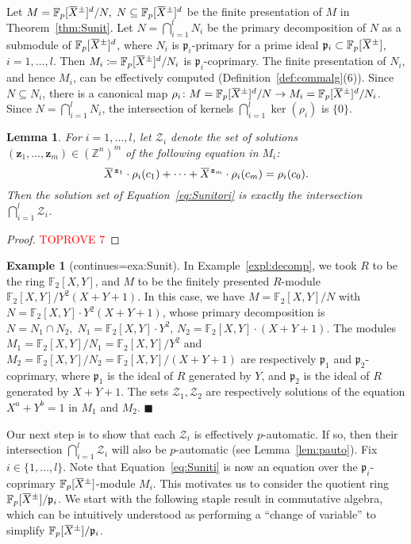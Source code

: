 \documentclass[a4paper,UKenglish,cleveref, autoref, thm-restate]{lipics-v2021}
\newcommand{\Z}{\mathbb{Z}}
\newcommand{\F}{\mathbb{F}}
\newcommand{\mZ}{\mathcal{Z}}
\newcommand{\bz}{\boldsymbol{z}}
\newcommand{\oX}{\mkern 1.5mu\overline{\mkern-1.5mu X \mkern-1.5mu}\mkern 1.5mu}
\newcommand{\frp}{\mathfrak{p}}
\newtheorem{lem}[thrm]{Lemma}
\theoremstyle{definition}
\theoremstyle{definition}
\newtheorem{exmpl}[thrm]{Example}
\theoremstyle{definition}
\begin{document}
Let $M = \F_p[\oX^{\pm}]^d/N, \; N \subseteq \F_p[\oX^{\pm}]^d$ be the finite presentation of $M$ in Theorem~\ref{thm:Sunit}.
Let $N = \bigcap_{i = 1}^l N_i$ be the primary decomposition of $N$ as a submodule of $\F_p[\oX^{\pm}]^d$, where $N_i$ is $\frp_i$-primary for a prime ideal $\frp_i \subset \F_p[\oX^{\pm}]$, $i = 1, \ldots, l$.
Then $M_i \coloneqq \F_p[\oX^{\pm}]^d/N_i$ is $\frp_i$-coprimary.
The finite presentation of $N_i$, and hence $M_i$, can be effectively computed (Definition~\ref{def:commalg}(6)).
Since $N \subseteq N_i$, there is a canonical map $\rho_i \colon M = \F_p[\oX^{\pm}]^d/N \rightarrow M_i = \F_p[\oX^{\pm}]^d/N_i$.
Since $N = \bigcap_{i = 1}^l N_i$, the intersection of kernels $\bigcap_{i=1}^l \ker(\rho_i)$ is $\{0\}$.



\begin{lem}\label{lem:inter}
    For $i = 1, \ldots, l$, let $\mZ_i$ denote the set of solutions $(\bz_1, \ldots, \bz_m) \in \left(\Z^n\right)^m$ of the following equation in $M_i$:
    \begin{equation}\label{eq:Suniti}
        \oX^{\bz_1} \cdot \rho_i(c_1) + \cdots + \oX^{\bz_m} \cdot \rho_i(c_m) = \rho_i(c_0).
    \end{equation}
    Then the solution set of Equation~\eqref{eq:Sunitori} is exactly the intersection $\bigcap_{i = 1}^l \mZ_i$.
\end{lem}
\begin{proof}\textcolor{red}{TOPROVE 7}\end{proof}

\renewcommand\thmcontinues[1]{continued}
\begin{exmpl}[continues=exa:Sunit]
In Example~\ref{expl:decomp}, we took $R$ to be the ring $\F_2[X, Y]$, and $M$ to be the finitely presented $R$-module $\F_2[X, Y]/Y^2(X+Y+1)$. In this case, we have $M = \F_2[X, Y]/N$ with $N = \F_2[X, Y] \cdot Y^2(X+Y+1)$, whose primary decomposition is $N = N_1 \cap N_2, \; N_1 = \F_2[X, Y] \cdot Y^2, \, N_2 = \F_2[X, Y] \cdot (X+Y+1)$. The modules $M_1 = \F_2[X, Y]/N_1 = \F_2[X, Y]/Y^2$ and $M_2 = \F_2[X, Y]/N_2 = \F_2[X, Y]/(X+Y+1)$ are respectively $\frp_1$ and $\frp_2$-coprimary, where $\frp_1$ is the ideal of $R$ generated by $Y$, and $\frp_2$ is the ideal of $R$ generated by $X+Y+1$.
The sets $\mZ_1, \mZ_2$ are respectively solutions of the equation $X^a + Y^b = 1$ in $M_1$ and $M_2$.
    \hfill $\blacksquare$
\end{exmpl}

Our next step is to show that each $\mZ_i$ is effectively $p$-automatic.
If so, then their intersection $\bigcap_{i = 1}^l \mZ_i$ will also be $p$-automatic (see Lemma~\ref{lem:pauto}).
Fix $i \in \{1, \ldots, l\}$. Note that Equation~\eqref{eq:Suniti} is now an equation over the $\frp_i$-coprimary $\F_p[\oX^{\pm}]$-module $M_i$.
This motivates us to consider the quotient ring $\F_p[\oX^{\pm}]/\frp_i$.
We start with the following staple result in commutative algebra, which can be intuitively understood as performing a ``change of variable'' to simplify $\F_p[\oX^{\pm}]/\frp_i$.
\end{document}
